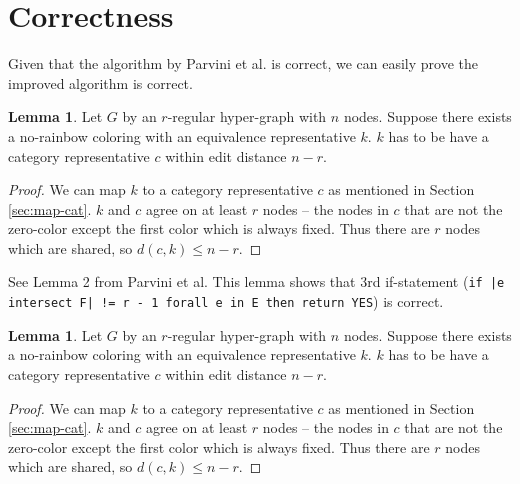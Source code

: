 \documentclass{book}
\theoremstyle{definition}
\newtheorem{lemma}[theorem]{Lemma}
\begin{document}
\section{Correctness}
Given that the algorithm by Parvini et al. is correct, we can easily prove the improved algorithm is correct.

\begin{lemma}
  Let $G$ by an $r$-regular hyper-graph with $n$ nodes. Suppose there exists a no-rainbow coloring with an equivalence representative $k$. $k$ has to be have a category representative $c$ within edit distance $n - r$.
\end{lemma}
\begin{proof}
  We can map $k$ to a category representative $c$ as mentioned in Section \ref{sec:map-cat}. $k$ and $c$ agree on at least $r$ nodes -- the nodes in $c$ that are not the zero-color except the first color which is always fixed. Thus there are $r$ nodes which are shared, so $d(c, k) \le n - r$.
\end{proof}

See Lemma 2 from Parvini et al. This lemma shows that 3rd if-statement (\texttt{if |e intersect F| != r - 1 forall e in E then return YES}) is correct.

\begin{lemma}
  Let $G$ by an $r$-regular hyper-graph with $n$ nodes. Suppose there exists a no-rainbow coloring with an equivalence representative $k$. $k$ has to be have a category representative $c$ within edit distance $n - r$.
\end{lemma}
\begin{proof}
  We can map $k$ to a category representative $c$ as mentioned in Section \ref{sec:map-cat}. $k$ and $c$ agree on at least $r$ nodes -- the nodes in $c$ that are not the zero-color except the first color which is always fixed. Thus there are $r$ nodes which are shared, so $d(c, k) \le n - r$.
\end{proof}

% 
\end{document}
